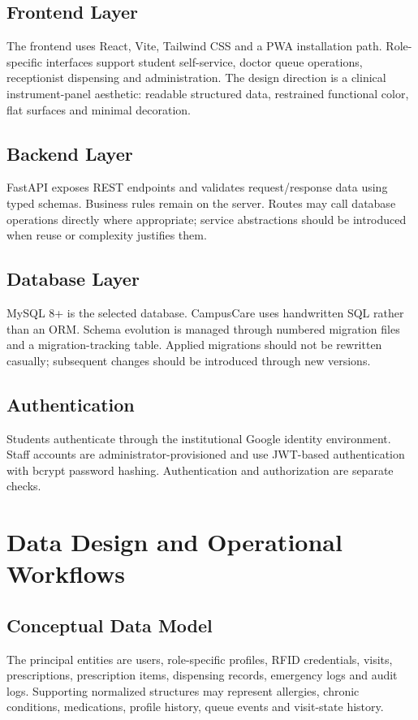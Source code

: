 \documentclass[a4paper,oneside,openany]{tietreport}
\begin{document}
\section{Frontend Layer}
The frontend uses React, Vite, Tailwind CSS and a PWA installation path. Role-specific interfaces support student self-service, doctor queue operations, receptionist dispensing and administration. The design direction is a clinical instrument-panel aesthetic: readable structured data, restrained functional color, flat surfaces and minimal decoration.

\section{Backend Layer}
FastAPI exposes REST endpoints and validates request/response data using typed schemas. Business rules remain on the server. Routes may call database operations directly where appropriate; service abstractions should be introduced when reuse or complexity justifies them.

\section{Database Layer}
MySQL 8+ is the selected database. CampusCare uses handwritten SQL rather than an ORM. Schema evolution is managed through numbered migration files and a migration-tracking table. Applied migrations should not be rewritten casually; subsequent changes should be introduced through new versions.

\section{Authentication}
Students authenticate through the institutional Google identity environment. Staff accounts are administrator-provisioned and use JWT-based authentication with bcrypt password hashing. Authentication and authorization are separate checks.

\chapter{Data Design and Operational Workflows}
\section{Conceptual Data Model}
The principal entities are users, role-specific profiles, RFID credentials, visits, prescriptions, prescription items, dispensing records, emergency logs and audit logs. Supporting normalized structures may represent allergies, chronic conditions, medications, profile history, queue events and visit-state history.
\end{document}
